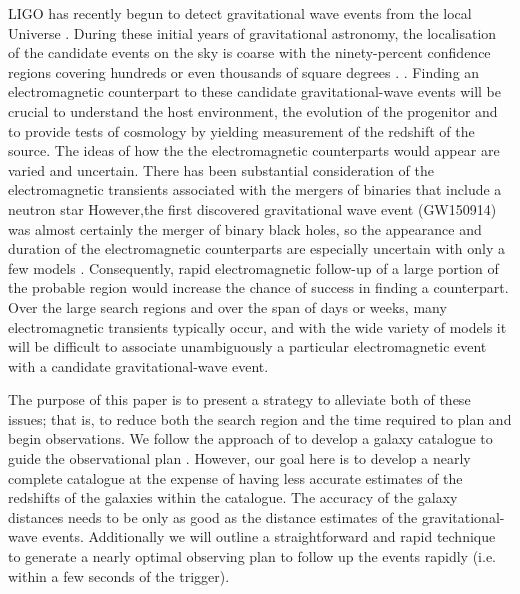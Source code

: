 \documentclass[useAMS,usenatbib]{mn2e}
\begin{document}
LIGO has recently begun to detect gravitational wave events from the
local Universe \citep{PhysRevLett.116.061102}.  During these initial
years of gravitational astronomy, the localisation of the candidate
events on the sky is coarse with the ninety-percent confidence regions
covering hundreds or even thousands of square degrees .
\citep{2014ApJ...789L...5K,2014ApJ...795..105S,2015ApJ...804..114B,2016LRR....19....1A}.
Finding an electromagnetic counterpart to these candidate
gravitational-wave events will be crucial to understand the host
environment, the evolution of the progenitor and to provide tests of
cosmology by yielding measurement of the redshift of the source.  The
ideas of how the the electromagnetic counterparts would appear are
varied and uncertain. There has been substantial consideration of the
electromagnetic transients associated with the mergers of binaries
that include a neutron star
\citep[e.g.][]{2016PhRvD..93b4011E,2016arXiv160107711K,2016arXiv160100017D,
  2015arXiv151205435F,2015ApJ...814L..20M,2015PhRvD..92d4028K,
  2015arXiv150807939S,2015arXiv150807911S} However,the first
discovered gravitational wave event (GW150914) was almost certainly
the merger of binary black holes, so the appearance and duration of
the electromagnetic counterparts are especially uncertain with only a
few models
\citep[e.g.][]{2015PhRvL.115n1102G,2015MNRAS.452.3419M,2016MNRAS.457..939C,2016ApJ...817..183Y}.
Consequently, rapid electromagnetic follow-up of a large portion of
the probable region would increase the chance of success in finding a
counterpart.  Over the large search regions and over the span of days
or weeks, many electromagnetic transients typically occur, and with
the wide variety of models it will be difficult to associate
unambiguously a particular electromagnetic event with a candidate
gravitational-wave event.

The purpose of this paper is to present a strategy to alleviate both
of these issues; that is, to reduce both the search region and the
time required to plan and begin observations.  We follow the approach of
\citet{2015arXiv150803608G} to develop a galaxy catalogue to guide the
observational plan \citep[see
  also][]{PhysRevD.82.102002,0004-637X-784-1-8,Ghosh2015,Fan2015,2015ApJ...801L...1B}.
However, our goal here is to develop a nearly complete catalogue at
the expense of having less accurate estimates of the redshifts of the
galaxies within the catalogue.  The accuracy of the galaxy distances
needs to be only as good as the distance estimates of the
gravitational-wave events.  Additionally we will outline a
straightforward and rapid technique to generate a nearly optimal
observing plan to follow up the events rapidly (i.e. within a few
seconds of the trigger).
\end{document}
